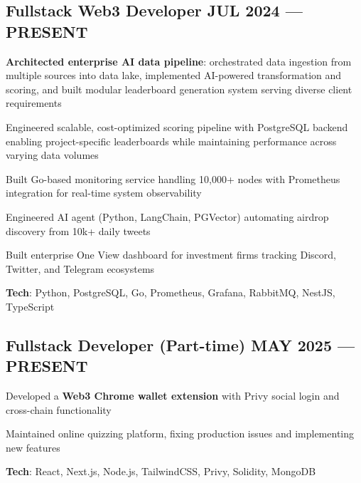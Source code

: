 \documentclass[letter,10pt]{article}
\begin{document}
\subsection{{Fullstack Web3 Developer \hfill JUL 2024 --- PRESENT}}
\begin{zitemize}
  \item \textbf{Architected enterprise AI data pipeline}: orchestrated data ingestion from multiple sources into data lake, implemented AI-powered transformation and scoring, and built modular leaderboard generation system serving diverse client requirements
  \item Engineered scalable, cost-optimized scoring pipeline with PostgreSQL backend enabling project-specific leaderboards while maintaining performance across varying data volumes
  \item Built Go-based monitoring service handling 10,000+ nodes with Prometheus integration for real-time system observability
  \item Engineered AI agent (Python, LangChain, PGVector) automating airdrop discovery from 10k+ daily tweets
  \item Built enterprise One View dashboard for investment firms tracking Discord, Twitter, and Telegram ecosystems
  \item \textbf{Tech}: Python, PostgreSQL, Go, Prometheus, Grafana, RabbitMQ, NestJS, TypeScript
\end{zitemize}


\subsection{{Fullstack Developer (Part-time) \hfill MAY 2025 --- PRESENT}}
\begin{zitemize}
  \item Developed a \textbf{Web3 Chrome wallet extension} with Privy social login and cross-chain functionality
  \item Maintained online quizzing platform, fixing production issues and implementing new features
  \item \textbf{Tech}: React, Next.js, Node.js, TailwindCSS, Privy, Solidity, MongoDB
\end{zitemize}
\end{document}
